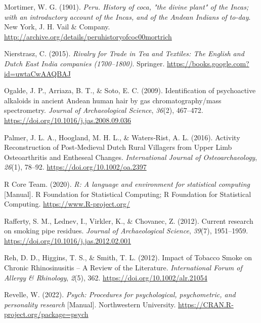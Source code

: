 \documentclass[
]{article}
\newlength{\cslhangindent}
\newlength{\cslentryspacingunit} %
\newenvironment{CSLReferences}[2] %
 {%
  \setlength{\parindent}{0pt}
  \ifodd #1
  \let\oldpar\par
  \def\par{\hangindent=\cslhangindent\oldpar}
  \fi
  \setlength{\parskip}{#2\cslentryspacingunit}
 }%
 {}
\begin{document}
\begin{CSLReferences}{1}{0}
\leavevmode{}%
Mortimer, W. G. (1901). \emph{Peru. {History} of coca, "the divine
plant" of the {Incas}; with an introductory account of the {Incas}, and
of the {Andean Indians} of to-day}. {New York, J. H. Vail \& Company}.
\url{http://archive.org/details/peruhistoryofcoc00mortrich}

\leavevmode{}%
Nierstrasz, C. (2015). \emph{Rivalry for {Trade} in {Tea} and
{Textiles}: {The English} and {Dutch East India} companies
(1700--1800)}. {Springer}.
\url{https://books.google.com?id=uwtaCwAAQBAJ}

\leavevmode{}%
Ogalde, J. P., Arriaza, B. T., \& Soto, E. C. (2009). Identification of
psychoactive alkaloids in ancient {Andean} human hair by gas
chromatography/mass spectrometry. \emph{Journal of Archaeological
Science}, \emph{36}(2), 467--472.
\url{https://doi.org/10.1016/j.jas.2008.09.036}

\leavevmode{}%
Palmer, J. L. A., Hoogland, M. H. L., \& Waters‐Rist, A. L. (2016).
Activity {Reconstruction} of {Post}‐{Medieval Dutch Rural Villagers}
from {Upper Limb Osteoarthritis} and {Entheseal Changes}.
\emph{International Journal of Osteoarchaeology}, \emph{26}(1), 78--92.
\url{https://doi.org/10.1002/oa.2397}

\leavevmode{}%
R Core Team. (2020). \emph{R: {A} language and environment for
statistical computing} {[}Manual{]}. {R Foundation for Statistical
Computing}; {R Foundation for Statistical Computing}.
\url{https://www.R-project.org/}

\leavevmode{}%
Rafferty, S. M., Lednev, I., Virkler, K., \& Chovanec, Z. (2012).
Current research on smoking pipe residues. \emph{Journal of
Archaeological Science}, \emph{39}(7), 1951--1959.
\url{https://doi.org/10.1016/j.jas.2012.02.001}

\leavevmode{}%
Reh, D. D., Higgins, T. S., \& Smith, T. L. (2012). Impact of {Tobacco
Smoke} on {Chronic Rhinosinusitis} -- {A Review} of the {Literature}.
\emph{International Forum of Allergy \& Rhinology}, \emph{2}(5), 362.
\url{https://doi.org/10.1002/alr.21054}

\leavevmode{}%
Revelle, W. (2022). \emph{Psych: {Procedures} for psychological,
psychometric, and personality research} {[}Manual{]}. {Northwestern
University}. \url{https://CRAN.R-project.org/package=psych}


\end{CSLReferences}
\end{document}
